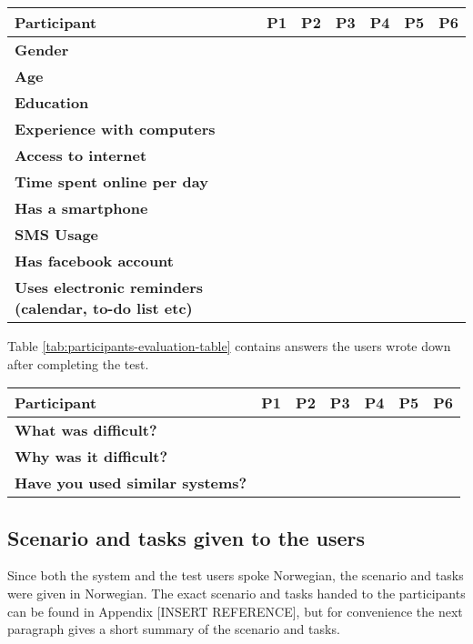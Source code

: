 \begin{sidewaystable}
	\label{tab:participants-table}
	\begin{tabular}{ | p{3.5cm} | p{3.0cm} | p{3.0cm} | p{3.0cm} | p{3.0cm} | p{3.0cm} | p{3.0cm} |}
	\hline
	\textbf{Participant} & P1 & P2 & P3 & P4 & P5 & P6 \\ \hline
	\textbf{Gender} & & & & & & \\ \hline
	\textbf{Age} & & & & & & & \\ \hline
	\textbf{Education} & & & & & & \\ \hline
	\textbf{Experience with computers} & & & & & & \\ \hline
	\textbf{Access to internet} & & & & & & \\ \hline
	\textbf{Time spent online per day} & & & & & & \\ \hline
	\textbf{Has a smartphone} & & & & & & \\ \hline
	\textbf{SMS Usage} & & & & & & \\ \hline
	\textbf{Has facebook account} & & & & & & \\ \hline
	\textbf{Uses electronic reminders (calendar, to-do list etc)} & & & & & & \\ \hline
	\end{tabular}
	\caption{Participants' experience with IT solutions}
\end{sidewaystable}


Table \ref{tab:participants-evaluation-table} contains answers the users wrote down after completing the test.

\begin{sidewaystable}
	\label{tab:participants-evaluation-table}
	\begin{tabular}{ | p{3.5cm} | p{3.0cm} | p{3.0cm} | p{3.0cm} | p{3.0cm} | p{3.0cm} | p{3.0cm} | }
	\hline
	\textbf{Participant} & P1 & P2 & P3 & P4 & P5 & P6 \\ \hline
	\textbf{What was difficult?} & & & & & & \\ \hline
	\textbf{Why was it difficult?} & & & & & & \\ \hline
	\textbf{Have you used similar systems?} & & & & & & \\ \hline
	\end{tabular}
	\caption{Participants's opinions upon finishing the test}
\end{sidewaystable}



\subsection{Scenario and tasks given to the users}
Since both the system and the test users spoke Norwegian, the scenario and tasks were given in Norwegian. The exact scenario and tasks handed to the participants can be found in Appendix [INSERT REFERENCE], but for convenience the next paragraph gives a short summary of the scenario and tasks.

